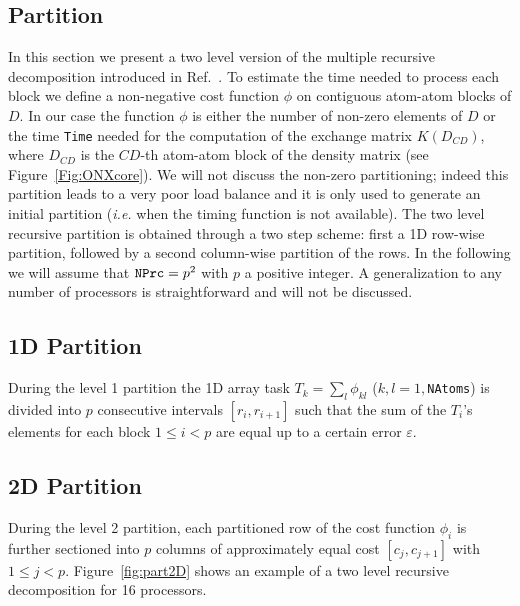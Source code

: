 \documentclass[prl,preprint,doublespace]{revtex4} %
\begin{document}
\subsection{Partition}
 In this section we present a two level version of the multiple recursive 
 decomposition introduced in Ref.~\cite{LRomero95}.
 To estimate the time needed to process each block we define
 a non-negative cost function $\phi$ on contiguous atom-atom blocks of
 $D$. In our case the function $\phi$ is either the number of 
 non-zero elements of $D$ or the time {\tt Time} needed for the computation
 of the exchange matrix $K(D_{CD})$, where $D_{CD}$ is the
 $CD$-th atom-atom block of the density matrix (see Figure~\ref{Fig:ONXcore}).
 We will not discuss the non-zero partitioning;
 indeed this partition leads to a very poor load balance and it is
 only used to generate an initial partition ({\em i.e.} when 
 the timing function is not available). 
 The two level recursive partition is obtained through 
 a two step scheme: first a 1D row-wise partition, followed by a 
 second column-wise partition of the rows.
 In the following we will assume that ${\tt NPrc}=p^2$ with $p$ a positive integer. %
 A generalization to any number of processors is straightforward and will not be discussed.

\subsection{1D Partition}
 During the level 1 partition the 1D array task $T_k=\sum_l\phi_{kl}$ ($k,l=1,${\tt NAtoms})
 is divided into $p$ consecutive intervals $[r_i,r_{i+1}]$ such that the sum of the $T_i$'s elements for
 each block $1 \le i < p$ are equal up to a certain error $\varepsilon$. 

\subsection{2D Partition}
 During the level 2 partition, each partitioned row of the cost function $\phi_{i}$
 is further sectioned into $p$ columns of approximately equal cost $[c_j,c_{j+1}]$ with $1 \le j < p$.
 Figure~\ref{fig:part2D} shows an example of a two level recursive decomposition
 for 16 processors.
\end{document}
